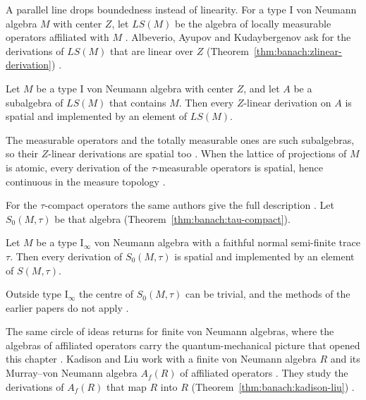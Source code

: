 A parallel line drops boundedness instead of linearity. For a type I von
Neumann algebra $M$ with center $Z$, let $LS(M)$ be the algebra of locally
measurable operators affiliated with $M$
\cite[p.~1]{AlbeverioAyupovKudaybergenov2007}. Albeverio, Ayupov and
Kudaybergenov ask for the derivations of $LS(M)$ that are linear over $Z$ (Theorem~\ref{thm:banach:zlinear-derivation})
\cite[p.~1]{AlbeverioAyupovKudaybergenov2007}.\begin{theorem}\label{thm:banach:zlinear-derivation}
Let $M$ be a type I von Neumann algebra with center $Z$, and let $A$ be a
subalgebra of $LS(M)$ that contains $M$. Then every $Z$-linear derivation on
$A$ is spatial and implemented by an element of $LS(M)$.
\end{theorem}

The measurable operators and the totally measurable ones are such
subalgebras, so their $Z$-linear derivations are spatial too
\cite[Corollary~3.10, p.~11]{AlbeverioAyupovKudaybergenov2007}. When the
lattice of projections of $M$ is atomic, every derivation of the
$\tau$-measurable operators is spatial, hence continuous in the measure
topology \cite[Corollary~3.11, p.~11]{AlbeverioAyupovKudaybergenov2007}.

For the $\tau$-compact operators the same authors give the full description
\cite[p.~1]{AlbeverioAyupovKudaybergenovKalandarov2008}. Let $S_{0}(M,\tau)$
be that algebra (Theorem~\ref{thm:banach:tau-compact}).

\begin{theorem}\label{thm:banach:tau-compact}
Let $M$ be a type $\mathrm{I}_\infty$ von Neumann algebra with a faithful
normal semi-finite trace $\tau$. Then every derivation of $S_{0}(M,\tau)$ is
spatial and implemented by an element of $S(M,\tau)$.
\end{theorem}

Outside type $\mathrm{I}_\infty$ the centre of $S_{0}(M,\tau)$ can be
trivial, and the methods of the earlier papers do not apply
\cite[p.~10]{AlbeverioAyupovKudaybergenovKalandarov2008}.

The same circle of ideas returns for finite von Neumann algebras, where the
algebras of affiliated operators carry the quantum-mechanical picture that
opened this chapter \cite[p.~2087]{KadisonLiu2014Murray}. Kadison and Liu work with a finite von Neumann algebra
$R$ and its Murray--von Neumann algebra $A_f(R)$ of affiliated operators
\cite[p.~2089]{KadisonLiu2014Murray}. They study the derivations of
$A_f(R)$ that map $R$ into $R$ (Theorem~\ref{thm:banach:kadison-liu}) \cite[p.~2089]{KadisonLiu2014Murray}.

